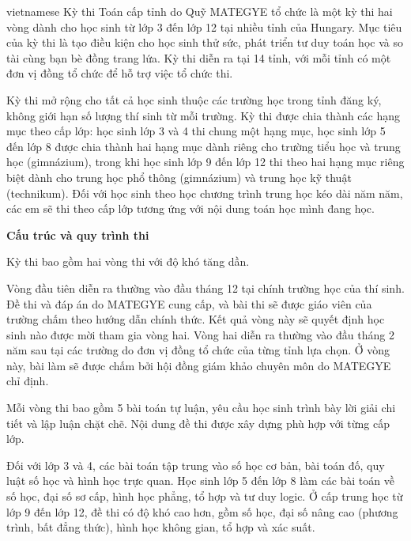 \documentclass{article}
\begin{document}
\begin{otherlanguage*}{vietnamese}
Kỳ thi Toán cấp tỉnh do Quỹ MATEGYE tổ chức là một kỳ thi hai vòng dành cho học sinh từ lớp 3 đến lớp 12 tại nhiều tỉnh của Hungary.
Mục tiêu của kỳ thi là tạo điều kiện cho học sinh thử sức, phát triển tư duy toán học và so tài cùng bạn bè đồng trang lứa.
Kỳ thi diễn ra tại 14 tỉnh, với mỗi tỉnh có một đơn vị đồng tổ chức để hỗ trợ việc tổ chức thi.

Kỳ thi mở rộng cho tất cả học sinh thuộc các trường học trong tỉnh đăng ký, không giới hạn số lượng thí sinh từ mỗi trường.
Kỳ thi được chia thành các hạng mục theo cấp lớp: học sinh lớp 3 và 4 thi chung một hạng mục,
học sinh lớp 5 đến lớp 8 được chia thành hai hạng mục dành riêng cho trường tiểu học và trung học (gimnázium),
trong khi học sinh lớp 9 đến lớp 12 thi theo hai hạng mục riêng biệt dành cho trung học phổ thông (gimnázium) và trung học kỹ thuật (technikum).
Đối với học sinh theo học chương trình trung học kéo dài năm năm, các em sẽ thi theo cấp lớp tương ứng với nội dung toán học mình đang học.

\textbf{Cấu trúc và quy trình thi}

Kỳ thi bao gồm hai vòng thi với độ khó tăng dần.
\begin{enumerate}[topsep=0pt, partopsep=0pt, itemsep=0pt]
    \ii Vòng đầu tiên diễn ra thường vào đầu tháng 12 tại chính trường học của thí sinh. Đề thi và đáp án do MATEGYE cung cấp,
    và bài thi sẽ được giáo viên của trường chấm theo hướng dẫn chính thức. Kết quả vòng này sẽ quyết định học sinh nào được mời tham gia vòng hai.
    \ii Vòng hai diễn ra thường vào đầu tháng 2 năm sau tại các trường do đơn vị đồng tổ chức của từng tỉnh lựa chọn.
    Ở vòng này, bài làm sẽ được chấm bởi hội đồng giám khảo chuyên môn do MATEGYE chỉ định.
\end{enumerate}

Mỗi vòng thi bao gồm 5 bài toán tự luận, yêu cầu học sinh trình bày lời giải chi tiết và lập luận chặt chẽ. Nội dung đề thi được xây dựng phù hợp với từng cấp lớp.
\begin{itemize}[topsep=0pt, partopsep=0pt, itemsep=0pt]
    \ii Đối với lớp 3 và 4, các bài toán tập trung vào số học cơ bản, bài toán đố, quy luật số học và hình học trực quan.
    \ii Học sinh lớp 5 đến lớp 8 làm các bài toán về số học, đại số sơ cấp, hình học phẳng, tổ hợp và tư duy logic.
    \ii Ở cấp trung học từ lớp 9 đến lớp 12, đề thi có độ khó cao hơn, gồm số học, đại số nâng cao (phương trình, bất đẳng thức), hình học không gian, tổ hợp và xác suất.
\end{itemize}


\end{otherlanguage*}
\end{document}
